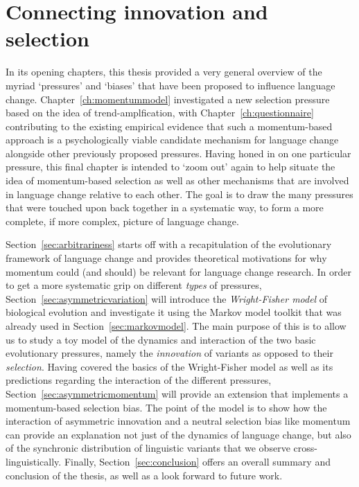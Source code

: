 \section{Connecting innovation and selection}

In its opening chapters, this thesis provided a very general overview of the myriad `pressures' and `biases' that have been proposed to influence language change. Chapter~\ref{ch:momentummodel} investigated a new selection pressure based on the idea of trend-amplfication, with Chapter~\ref{ch:questionnaire} contributing to the existing empirical evidence that such a momentum-based approach is a psychologically viable candidate mechanism for language change alongside other previously proposed pressures.
Having honed in on one particular pressure, this final chapter is intended to `zoom out' again to help situate the idea of momentum-based selection as well as other mechanisms that are involved in language change relative to each other. %
The goal is to draw the many pressures that were touched upon back together in a systematic way, to form a more complete, if more complex, picture of language change. %

Section~\ref{sec:arbitrariness} starts off with a recapitulation of the evolutionary framework of language change and provides theoretical motivations for why momentum could (and should) be relevant for language change research.
In order to get a more systematic grip on different \emph{types} of pressures, Section~\ref{sec:asymmetricvariation} will introduce the \emph{Wright-Fisher model} of biological evolution and investigate it using the Markov model toolkit that was already used in Section~\ref{sec:markovmodel}. The main purpose of this is to allow us to study a toy model of the dynamics and interaction of the two basic evolutionary pressures, namely the \emph{innovation} of variants as opposed to their \emph{selection}. Having covered the basics of the Wright-Fisher model as well as its predictions regarding the interaction of the different pressures, Section~\ref{sec:asymmetricmomentum} will provide an extension that implements a momentum-based selection bias. The point of the model is to show how the interaction of asymmetric innovation and a neutral selection bias like momentum can provide an explanation not just of the dynamics of language change, but also of the synchronic distribution of linguistic variants that we observe cross-linguistically.
Finally, Section~\ref{sec:conclusion} offers an overall summary and conclusion of the thesis, as well as a look forward to future work.

